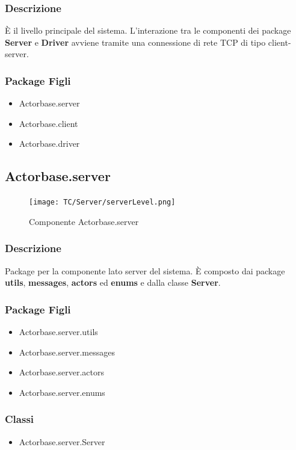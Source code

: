 \documentclass[a4paper]{article}
\begin{document}
			\subsubsection{Descrizione}
				È il livello principale del sistema. L'interazione tra le componenti dei package \textbf{Server} e \textbf{Driver} avviene tramite una 
				connessione di rete TCP di tipo client-server.
				
			\subsubsection{Package Figli}
				\begin{itemize}
					\item Actorbase.server
					\item Actorbase.client
					\item Actorbase.driver
				\end{itemize}
				
		\subsection{Actorbase.server}
		
			\begin{figure}[H]
				\centering
				\texttt{[image: TC/Server/serverLevel.png]}
				\caption{Componente Actorbase.server}
			\end{figure}
			\subsubsection{Descrizione}
				Package per la componente lato server del sistema. 
				È composto dai package \textbf{utils}, \textbf{messages}, \textbf{actors} ed \textbf{enums} e dalla classe \textbf{Server}.\\
				
			\subsubsection{Package Figli}
				\begin{itemize}
					\item Actorbase.server.utils
					\item Actorbase.server.messages
					\item Actorbase.server.actors
					\item Actorbase.server.enums
				\end{itemize}
				
			\subsubsection{Classi}
				\begin{itemize}
					\item Actorbase.server.Server
				\end{itemize}
				
\end{document}
